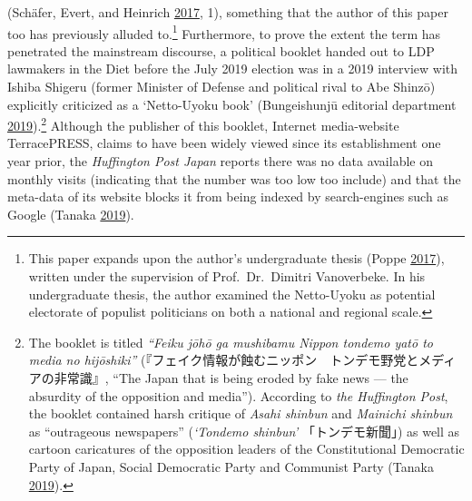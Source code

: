 \documentclass[10pt,british,A4paper,twoside]{memoir}
\begin{document}
(Schäfer, Evert, and Heinrich
\protect\hyperlink{ref-schafer_japans_2017}{2017}, 1), something that
the author of this paper too has previously alluded to.\footnote{This
  paper expands upon the author's undergraduate thesis (Poppe
  \protect\hyperlink{ref-poppe_digitaal_2017}{2017}), written under the
  supervision of Prof.~Dr.~Dimitri Vanoverbeke. In his undergraduate
  thesis, the author examined the Netto-Uyoku as potential electorate of
  populist politicians on both a national and regional scale.}
Furthermore, to prove the extent the term has penetrated the mainstream
discourse, a political booklet handed out to LDP lawmakers in the Diet
before the July 2019 election was in a 2019 interview with Ishiba
Shigeru (former Minister of Defense and political rival to Abe Shinzō)
explicitly criticized as a `Netto-Uyoku book' (Bungeishunjū editorial
department
\protect\hyperlink{ref-bungeishunju_editorial_department_eng._2019}{2019}).\footnote{The
  booklet is titled \emph{``Feiku jōhō ga mushibamu Nippon tondemo yatō
  to media no hijōshiki''}
  (『フェイク情報が蝕むニッポン　トンデモ野党とメディアの非常識』, ``The
  Japan that is being eroded by fake news --- the absurdity of the
  opposition and media''). According to \emph{the Huffington Post}, the
  booklet contained harsh critique of \emph{Asahi shinbun} and
  \emph{Mainichi shinbun} as ``outrageous newspapers'' (\emph{`Tondemo
  shinbun'} 「トンデモ新聞」) as well as cartoon caricatures of the
  opposition leaders of the Constitutional Democratic Party of Japan,
  Social Democratic Party and Communist Party (Tanaka
  \protect\hyperlink{ref-tanaka_eng._2019}{2019}).} Although the
publisher of this booklet, Internet media-website TerracePRESS, claims
to have been widely viewed since its establishment one year prior, the
\emph{Huffington Post Japan} reports there was no data available on
monthly visits (indicating that the number was too low too include) and
that the meta-data of its website blocks it from being indexed by
search-engines such as Google (Tanaka
\protect\hyperlink{ref-tanaka_eng._2019}{2019}).
\end{document}
